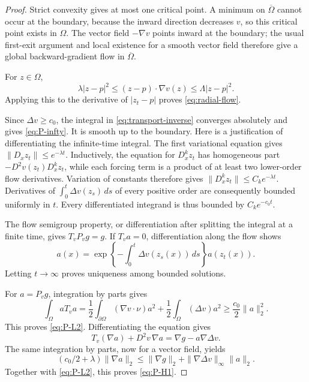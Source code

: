 \documentclass[11pt]{article}
\theoremstyle{remark}
\begin{document}
\begin{proof}
Strict convexity gives at most one critical point. A minimum on
\(\overline\Omega\) cannot occur at the boundary, because the inward
direction decreases \(v\), so this critical point exists in \(\Omega\).
The vector field \(-\nabla v\) points inward at the boundary;
the usual first-exit argument  and local existence for a smooth
vector field therefore give a global backward-gradient flow in
\(\overline\Omega\).

For \(z\in\Omega\),
\[
\lambda|z-p|^2
\leq (z-p)\cdot\nabla v(z)
\leq\Lambda|z-p|^2.
\]
Applying this to the derivative of \(|z_t-p|\) proves
\eqref{eq:radial-flow}.

Since \(\Delta v\geq c_0\), the integral in
\eqref{eq:transport-inverse} converges absolutely and gives
\eqref{eq:P-infty}. It is smooth up to the boundary. Here is a
justification of differentiating the infinite-time integral.
The first variational equation gives
\(\|D_xz_t\|\leq e^{-\lambda t}\).
Inductively, the equation for \(D_x^kz_t\) has homogeneous part
\(-D^2v(z_t)D_x^kz_t\), while each forcing term is a product of
at least two lower-order flow derivatives. Variation of constants
therefore gives
\(\|D_x^kz_t\|\leq C_ke^{-\lambda t}\).
Derivatives of \(\int_0^t\Delta v(z_s)\,ds\) of every positive
order are consequently bounded uniformly in \(t\).
Every differentiated integrand is thus bounded by \(C_ke^{-c_0t}\).

The flow semigroup property, or differentiation after splitting the
integral at a finite time, gives \(T_vP_vg=g\).
If \(T_va=0\), differentiation along the flow shows
\[
a(x)=
\exp\left\{-\int_0^t\Delta v(z_s(x))\,ds\right\}a(z_t(x)).
\]
Letting \(t\to\infty\) proves uniqueness among bounded solutions.

For \(a=P_vg\), integration by parts gives
\[
\int_\Omega aT_va
=
\frac12\int_{\partial\Omega}(\nabla v\cdot\nu)a^2
+\frac12\int_\Omega(\Delta v)a^2
\geq\frac{c_0}{2}\|a\|_2^2.
\]
This proves \eqref{eq:P-L2}. Differentiating the equation gives
\[
T_v(\nabla a)+D^2v\,\nabla a
=\nabla g-a\nabla\Delta v.
\]
The same integration by parts, now for a vector field, yields
\[
(c_0/2+\lambda)\|\nabla a\|_2
\leq\|\nabla g\|_2+\|\nabla\Delta v\|_\infty\|a\|_2.
\]
Together with \eqref{eq:P-L2}, this proves \eqref{eq:P-H1}.
\end{proof}
\end{document}
